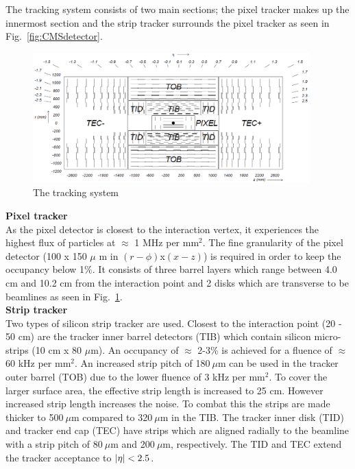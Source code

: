 The tracking system consists of two main sections; the pixel tracker makes up the innermost section and the strip tracker surrounds the pixel tracker as seen in Fig.~\ref{fig:CMSdetector}. 

\begin{figure}[ht!]
\centering
    \includegraphics[width=0.95\textwidth]{images/TrackerWhole.png}
    \caption{The tracking system~\cite{1748-0221-3-08-S08004}}
    \label{fig:TrackerWhole}
\end{figure}

\textbf{Pixel tracker}\\
As the pixel detector is closest to the interaction vertex, it experiences the highest flux of particles at $\approx$ 1 MHz per mm$^{2}$. The fine granularity of the pixel detector (100 x 150 $\mu$ m in $(r-\phi)$x$(x-z)$) is required in order to keep the occupancy below 1\%. It consists of three barrel layers which range between 4.0 cm and 10.2 cm from the interaction point and 2 disks which are transverse to be beamlines as seen in Fig.~\ref{fig:TrackerWhole}.\\

\textbf{Strip tracker}\\
Two types of silicon strip tracker are used. Closest to the interaction point (20 - 50 cm) are the tracker inner barrel detectors (TIB) which contain silicon micro-strips (10 cm x 80 $\mu$m). An occupancy of $\approx$ 2-3\% is achieved for a fluence of $\approx$ 60 kHz per mm$^{2}$.
An increased strip pitch of 180$~\mu$m can be used in the tracker outer barrel (TOB) due to the lower fluence of 3 kHz per mm$^{2}$. To cover the larger surface area, the effective strip length is increased to 25 cm. However increased strip length increases the noise. To combat this the strips are made thicker to 500$~\mu$m compared to 320$~\mu$m in the TIB.
The tracker inner disk (TID) and tracker end cap (TEC) have strips which are aligned radially to the beamline with a strip pitch of 80$~\mu$m and 200$~\mu$m, respectively. The TID and TEC extend the tracker acceptance to $\lvert \eta \rvert<2.5$.


